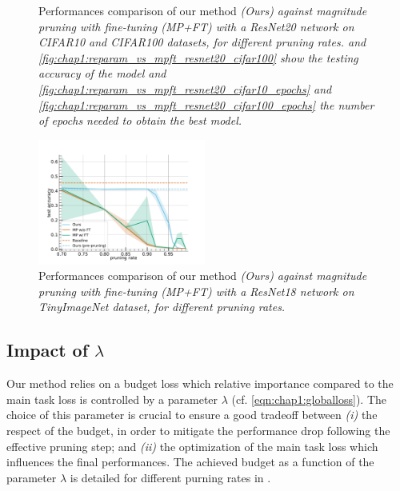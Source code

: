 \begin{figure}
  \caption{\centering Performances comparison of our method \em{(Ours)} against
  magnitude pruning with fine-tuning \em{(MP+FT)} with a ResNet20 network on
  CIFAR10 and CIFAR100 datasets, for different pruning rates.
   and
  \cref{fig:chap1:reparam_vs_mpft_resnet20_cifar100} show the
  testing accuracy of the model and
  \cref{fig:chap1:reparam_vs_mpft_resnet20_cifar10_epochs} and
  \cref{fig:chap1:reparam_vs_mpft_resnet20_cifar100_epochs}
  the number of epochs needed to obtain the best model.}
  \label{fig:chap1:reparam_vs_mpft_resnet20}
\end{figure}


\begin{figure}
  \centering
  \includegraphics[width=0.49\textwidth]{chapter_1/assets/reparam_vs_mpft_PrunableResNet18_tinyimagenet.pdf}
  \caption{Performances comparison of our method \em{(Ours)} against
  magnitude pruning with fine-tuning \em{(MP+FT)} with a ResNet18 network on
  TinyImageNet dataset, for different pruning rates.}
  \label{fig:chap1:reparam_vs_mpft_resnet18}
\end{figure}


\subsection{Impact of \texorpdfstring{$\lambda$}{Lambda}}
\label{sec:chap1:impact_of_lambda}
Our method relies on a budget loss which relative importance compared to the
main task loss is controlled by a parameter $\lambda$ (cf.
\cref{eqn:chap1:globalloss}). The choice of this parameter is crucial
to ensure a good tradeoff between \emph{(i)} the respect of the budget, in
order to mitigate the performance drop following the effective pruning step; and
\emph{(ii)} the optimization of the main task loss which influences the final
performances. The achieved budget as a function of the parameter $\lambda$ is
detailed for different purning rates in
.\\

